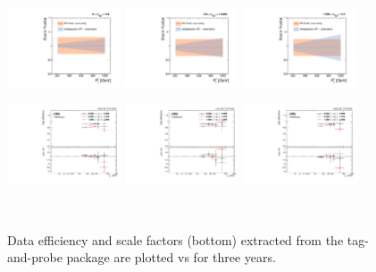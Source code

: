 \begin{figure}[!htbp]
  \includegraphics[width=0.3\textwidth]{fig/Extrapolate_2018_0_Compare.pdf}
  \includegraphics[width=0.3\textwidth]{fig/Extrapolate_2018_1_Compare.pdf}
  \includegraphics[width=0.3\textwidth]{fig/Extrapolate_2018_2_Compare.pdf}
 
  \label{fig:Extrapolation2018}
\end{figure}

\begin{figure}[!htbp]
\caption{Data efficiency and scale factors (bottom) extracted from the tag-and-probe package are plotted vs \pt for three years.}
\begin{center}
\includegraphics[angle=0,width=0.3\textwidth]{fig/eff2016.pdf}
\includegraphics[angle=0,width=0.3\textwidth]{fig/eff2017.pdf}
\includegraphics[angle=0,width=0.3\textwidth]{fig/eff2018.pdf}
\end{center}
~\label{fig:SFvsPt}
\end{figure}

